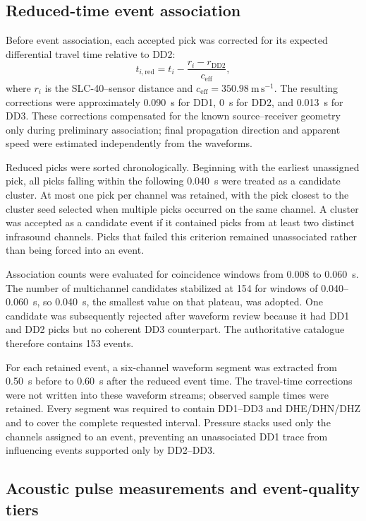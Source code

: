 \documentclass[]{seismica}
\begin{document}
\subsection{Reduced-time event association}

Before event association, each accepted pick was corrected for its expected differential travel time relative to DD2:
\begin{equation}
  t_{i,\mathrm{red}} = t_i - \frac{r_i-r_{\mathrm{DD2}}}{c_{\mathrm{eff}}},
  \label{eq:reduced_time}
\end{equation}
where $r_i$ is the SLC-40--sensor distance and $c_{\mathrm{eff}}=350.98~\mathrm{m\,s^{-1}}$. The resulting corrections were approximately 0.090~s for DD1, 0~s for DD2, and 0.013~s for DD3. These corrections compensated for the known source--receiver geometry only during preliminary association; final propagation direction and apparent speed were estimated independently from the waveforms.

Reduced picks were sorted chronologically. Beginning with the earliest unassigned pick, all picks falling within the following 0.040~s were treated as a candidate cluster. At most one pick per channel was retained, with the pick closest to the cluster seed selected when multiple picks occurred on the same channel. A cluster was accepted as a candidate event if it contained picks from at least two distinct infrasound channels. Picks that failed this criterion remained unassociated rather than being forced into an event.

Association counts were evaluated for coincidence windows from 0.008 to
0.060~s. The number of multichannel candidates stabilized at 154 for windows
of 0.040--0.060~s, so 0.040~s, the smallest value on that plateau, was adopted.
One candidate was subsequently rejected after waveform review because it had
DD1 and DD2 picks but no coherent DD3 counterpart. The authoritative catalogue
therefore contains 153 events.

For each retained event, a six-channel waveform segment was extracted from
0.50~s before to 0.60~s after the reduced event time. The travel-time
corrections were not written into these waveform streams; observed sample
times were retained. Every segment was required to contain DD1--DD3 and
DHE/DHN/DHZ and to cover the complete requested interval. Pressure stacks used
only the channels assigned to an event, preventing an unassociated DD1 trace
from influencing events supported only by DD2--DD3.

\subsection{Acoustic pulse measurements and event-quality tiers}
\end{document}

